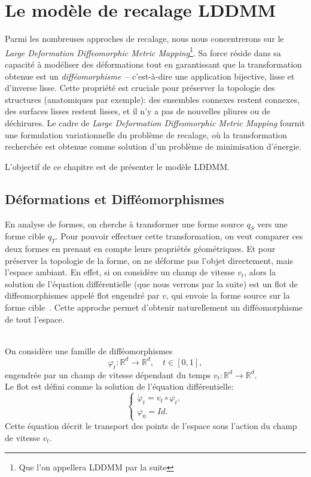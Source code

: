 \documentclass[12pt]{report}
\begin{document}
\chapter{Le modèle de recalage LDDMM}\label{chap:LDDMM}

Parmi les nombreuses approches de recalage, nous nous concentrerons sur le \emph{Large Deformation Diffeomorphic Metric Mapping}\footnote{Que l'on appellera LDDMM par la suite}. Sa force réside dans sa capacité à modéliser des déformations tout en garantissant que la transformation obtenue est un \emph{difféomorphisme}~-- c'est-à-dire une application bijective, lisse et d'inverse lisse. Cette propriété est cruciale pour préserver la topologie des structures (anatomiques par exemple): des ensembles connexes restent connexes, des surfaces lisses restent lisses, et il n'y a pas de nouvelles pliures ou de déchirures. Le cadre de \emph{Large Deformation Diffeomorphic Metric Mapping} fournit une formulation variationnelle du problème de recalage, où la transformation recherchée est obtenue comme solution d'un problème de minimisation d'énergie.

L'objectif de ce chapitre est de présenter le modèle LDDMM\@.

\section{Déformations et Difféomorphismes}

En analyse de formes, on cherche à transformer une forme source $q_S$ vers une forme cible $q_T$. Pour pouvoir effectuer cette transformation, on veut comparer ces deux formes en prenant en compte leurs propriétés géométriques. Et pour préserver la topologie de la forme, on ne déforme pas l'objet directement, mais l'espace ambiant. En effet, si on considère un champ de vitesse $v_t$, alors la solution de l'équation différentielle (que nous verrons par la suite) est un flot de diffeomorphismes appelé flot engendré par $v$, qui envoie la forme source sur la forme cible~\cite{Pie25}. Cette approche permet d'obtenir naturellement un difféomorphisme de tout l'espace.

\begin{definition}\leavevmode\\
On considère une famille de difféomorphismes
\[
\varphi_t : \mathbb{R}^d \to \mathbb{R}^d, \quad t \in [0,1],
\]
engendrée par un champ de vitesse dépendant du temps $v_t : \mathbb{R}^d \to \mathbb{R}^d$.\\
Le flot est défini comme la solution de l'équation différentielle:
\[
\left\{\begin{array}{ll}\dot{\varphi}_t = v_t \circ \varphi_t,\\\varphi_0 = Id.\end{array}\right.
\]
Cette équation décrit le transport des points de l'espace sous l'action du champ de vitesse $v_t$.
\end{definition}
\end{document}
